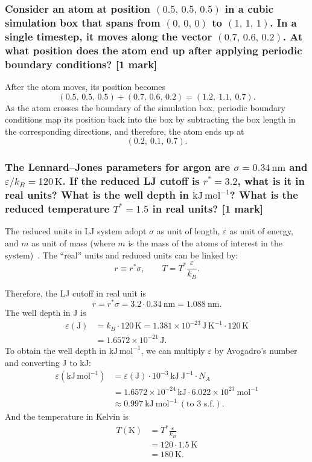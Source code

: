 \documentclass[a4paper,10pt,twocolumn]{article}
\begin{document}
\subsubsection*{Consider an atom at position $(0.5,\,0.5,\,0.5)$ in a cubic simulation box that spans from $(0,\,0,\,0)$ to $(1,\,1,\,1)$. In a single timestep, it moves along the vector $(0.7,\,0.6,\,0.2)$. At what position does the atom end up after applying periodic boundary conditions? [1 mark]}
After the atom moves, its position becomes
\[
(0.5,\,0.5,\,0.5)+ (0.7,\,0.6,\,0.2)=(1.2,\ 1.1,\ 0.7).
\] 
As the atom crosses the boundary of the simulation box, periodic boundary conditions map its position back into the box by subtracting the box length in the corresponding directions, and therefore, the atom ends up at
\[
(0.2,\ 0.1,\ 0.7).
\]
\subsubsection*{The Lennard--Jones parameters for argon are $\sigma = 0.34\,\mathrm{nm}$ and $\varepsilon/k_B = 120\,\mathrm{K}$. If the reduced LJ cutoff is $r^* = 3.2$, what is it in real units? What is the well depth in $\mathrm{kJ\,mol^{-1}}$? What is the reduced temperature $T^* = 1.5$ in real units? [1 mark]}
The reduced units in LJ system adopt $\sigma$ as unit of length, $\varepsilon$ as unit of energy, and $m$ as unit of mass (where $m$ is the mass of the atoms of interest in the system)~\cite{frenkel2023understanding}. The ``real'' units and reduced units can be linked by:
\[
r\equiv r^*\sigma,\qquad T=T^*\frac{\varepsilon}{k_B}.
\]

Therefore, the LJ cutoff in real unit is 
\[
r=r^*\sigma=3.2\cdot 0.34\ \mathrm{nm}=1.088\ \mathrm{nm}.
\]
The well depth in $\mathrm{J}$ is
\begin{align*}
\varepsilon(\mathrm{J}) &= k_B \cdot 120\,\mathrm{K} =1.381\times10^{-23}\,\mathrm{J\,K^{-1}}\cdot120\,\mathrm{K} 
\\
&=  1.6572\times10^{-21}\,\mathrm{J}.
\end{align*}
To obtain the well depth in $\mathrm{kJ\,mol^{-1}}$, we can multiply $\varepsilon$ by Avogadro's number and converting J to kJ:
\begin{align*}
\varepsilon(\mathrm{kJ\,mol^{-1}}) 
&= \varepsilon(\mathrm{J})\cdot10^{-3}\ \mathrm{kJ\ J^{-1}}\cdot N_A
\\
&=  1.6572\times10^{-24}\,\mathrm{kJ}\cdot 6.022\times10^{23}\ \mathrm{mol^{-1}}
\\
&\approx 0.997\ \mathrm{kJ\ mol^{-1}}\ (\text{to 3 s.f.}).
\end{align*}
And the temperature in Kelvin is
\begin{align*}
T(\mathrm{K}) &= T^*\frac{\varepsilon}{k_B}
\\
&=  120\cdot 1.5\ \mathrm{K}
\\
&= 180\ \mathrm{K}.
\end{align*}
\end{document}
